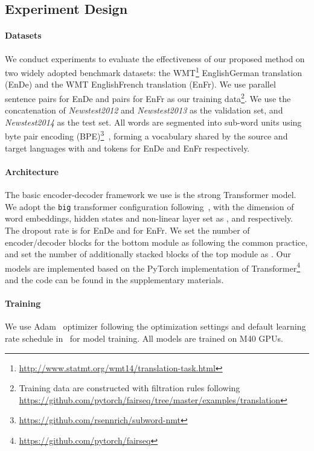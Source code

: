 \documentclass[11pt,a4paper]{article}
\begin{document}
\subsection{Experiment Design}
\paragraph{Datasets}
We conduct experiments to evaluate the effectiveness of our proposed method on two widely adopted benchmark datasets: the WMT\footnote{\url{http://www.statmt.org/wmt14/translation-task.html}} EnglishGerman translation (EnDe) and the WMT EnglishFrench translation (EnFr). We use  parallel sentence pairs for EnDe and  pairs for EnFr as our training data\footnote{Training data are constructed with filtration rules following \url{https://github.com/pytorch/fairseq/tree/master/examples/translation}}. We use the concatenation of \emph{Newstest2012} and \emph{Newstest2013} as the validation set, and \emph{Newstest2014} as the test set. All words are segmented into sub-word units using byte pair encoding (BPE)\footnote{\url{https://github.com/rsennrich/subword-nmt}}~\citep{sennrich2016neural}, forming a vocabulary shared by the source and target languages with  and  tokens for EnDe and EnFr respectively.

\paragraph{Architecture}
The basic encoder-decoder framework we use is the strong Transformer model. We adopt the \texttt{big} transformer configuration following~\citet{vaswani2017attention}, with the dimension of word embeddings, hidden states and non-linear layer set as ,  and  respectively. The dropout rate is  for EnDe and  for EnFr. We set the number of encoder/decoder blocks for the bottom module as  following the common practice, and set the number of additionally stacked blocks of the top module as . Our models are implemented based on the PyTorch implementation of Transformer\footnote{\url{https://github.com/pytorch/fairseq}} and the code can be found in the supplementary materials.

\paragraph{Training}
We use Adam~\citep{kingma2015adam} optimizer following the optimization settings and default learning rate schedule in~\citet{vaswani2017attention} for model training. All models are trained on  M40 GPUs.
\end{document}
